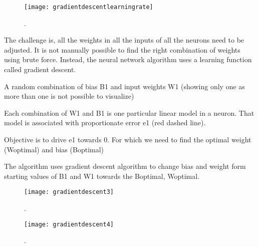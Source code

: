  	\begin{figure}[h]
		\centering
		\texttt{[image: gradientdescentlearningrate]}
		\caption{.}
		\label{fig:gradientdescentlearningrate}
	\end{figure}

The challenge is, all the weights in all the inputs of all the neurons need to be adjusted. It is not manually possible to find the right combination of weights using brute force. Instead, the neural network algorithm uses a learning function called gradient descent.
	\begin{numberedlist}
		\item A random combination of bias B1 and input weights W1 (showing only one as more than one is not possible to visualize)
		\item Each combination of W1 and B1 is one particular linear model in a neuron. That model is associated with proportionate error e1 (red dashed line).
		\item Objective is to drive e1 towards 0. For which we need to find the optimal weight (Woptimal) and bias (Boptimal)
		\item The algorithm uses gradient descent algorithm to change bias and weight form starting values of B1 and W1 towards the Boptimal, Woptimal.
	\end{numberedlist}

 	\begin{figure}[h]
		\centering
		\texttt{[image: gradientdescent3]}
		\caption{.}
		\label{fig:gradientdescent3}
	\end{figure}

 	\begin{figure}[h]
		\centering
		\texttt{[image: gradientdescent4]}
		\caption{.}
		\label{fig:gradientdescent4}
	\end{figure}


